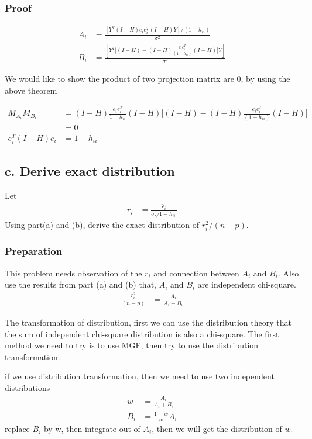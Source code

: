 \subsubsection{Proof}

\begin{align*}
	A_i & = \frac{ [Y^T (I-H) e_i e_i^T (I-H) Y]/(1-h_{ii})}{\sigma^2} \\
	B_i &=  \frac{ [Y^T \Big[(I-H) - (I-H) \frac{e_i e_i^T }{(1-h_{ii})} (I-H) \Big]Y]}{\sigma^2} 
\end{align*} 

We would like to show the product of two projection matrix are 0, by using the above theorem

\begin{align*}
	M_{A_i} M_{B_i} & = (I-H)  \frac{e_i e_i^T }{1-h_{ii}} (I-H)  \Big[(I-H) - (I-H) \frac{e_i e_i^T }{(1-h_{ii})} (I-H) \Big] \\
	&= 0 \\
	e_i^T (I-H) e_i &= 1-h_{ii}
\end{align*} 


\subsection{c. Derive exact distribution}
Let
\begin{align*}
	r_i & = \frac{\hat{\epsilon}_i}{\hat{\sigma} \sqrt{1- h_{ii}}}
\end{align*} 
Using part(a) and (b), derive the exact distribution of $r_i^2/ (n-p)$.

\subsubsection{Preparation}

This problem needs observation of the $r_i$ and connection between $A_i$ and $B_i$. Also use the results from part (a) and (b) that, $A_i$ and $B_i$ are independent chi-square.
\begin{align*}
	\frac{r_i^2 }{(n-p)} & = \frac{A_i}{A_i + B_i} 
\end{align*} 

The transformation of distribution, first we can use the distribution theory that the sum of independent chi-square distribution is also a chi-square. 
The first method we need to try is to use MGF, then try to use the distribution transformation.

if we use distribution transformation, then we need to use two independent distributions
\begin{align*}
	w & = \frac{A_i}{A_i + B_i} \\
	B_i &= \frac{1-w}{w} A_i
\end{align*} 
replace $B_i$ by w, then integrate out of $A_i$, then we will get the distribution of $w$.

